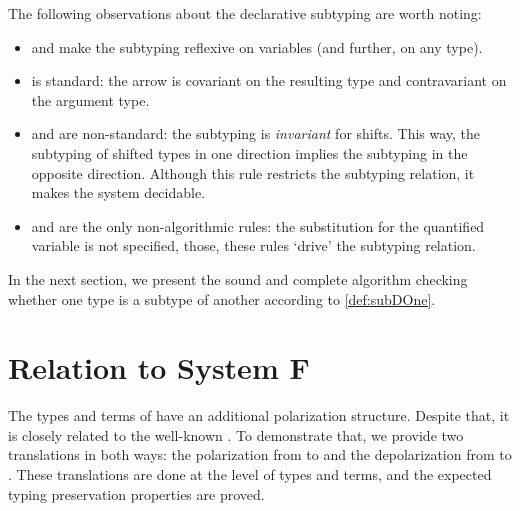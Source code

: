 \documentclass[acmsmall,natbib=false,review,anonymous]{acmart}
\begin{document}
\begin{definition} 
  \label{def:subDOne}
  \hfill
  
  \begin{multicols}{2}
    \ottdefnDOneNsubLabeled{}

    \ottdefnDOnePsupLabeled{}
  \end{multicols}
  \hfill

  \begin{multicols}{2}
    \ottdefnDOneNeqLabeled{}

    \ottdefnDOnePeqLabeled{}
  \end{multicols}
\end{definition}

The following observations about the declarative subtyping are worth noting:
\begin{itemize}
  \item {} and 
    make the subtyping reflexive on variables (and further, on any type).
  \item {} is standard: the arrow is covariant on the
    resulting type and contravariant on the argument type.
  \item {}  and  are non-standard:
    the subtyping is \emph{invariant} for shifts. 
    This way, the subtyping of shifted types in one direction implies the subtyping
    in the opposite direction.
    Although this rule restricts the
    subtyping relation, it makes the system decidable.
  \item {} and  are the only
    non-algorithmic rules: the substitution for the quantified variable is
    not specified, those, these rules `drive' the subtyping relation.
\end{itemize}

In the next section, we present the sound and complete algorithm
checking whether one type is a subtype of another according to \cref{def:subDOne}. 

\section{Relation to System F}

The types and terms of \fexists have an additional polarization structure.
Despite that, it is closely related to the well-known \systemf.
To demonstrate that, we provide two translations in both ways:
the polarization from \systemf to \fexists and the depolarization from 
\fexists to \systemf. These translations are done at the level of types and terms,
and the expected typing preservation properties are proved.
\end{document}

